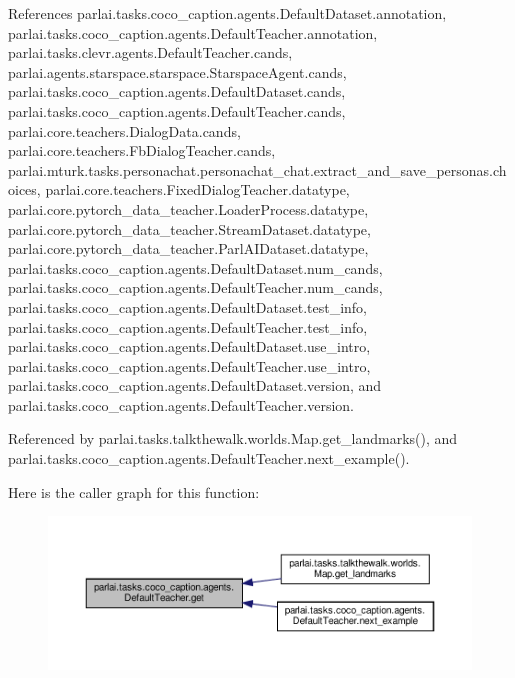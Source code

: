 References parlai.\+tasks.\+coco\+\_\+caption.\+agents.\+Default\+Dataset.\+annotation, parlai.\+tasks.\+coco\+\_\+caption.\+agents.\+Default\+Teacher.\+annotation, parlai.\+tasks.\+clevr.\+agents.\+Default\+Teacher.\+cands, parlai.\+agents.\+starspace.\+starspace.\+Starspace\+Agent.\+cands, parlai.\+tasks.\+coco\+\_\+caption.\+agents.\+Default\+Dataset.\+cands, parlai.\+tasks.\+coco\+\_\+caption.\+agents.\+Default\+Teacher.\+cands, parlai.\+core.\+teachers.\+Dialog\+Data.\+cands, parlai.\+core.\+teachers.\+Fb\+Dialog\+Teacher.\+cands, parlai.\+mturk.\+tasks.\+personachat.\+personachat\+\_\+chat.\+extract\+\_\+and\+\_\+save\+\_\+personas.\+choices, parlai.\+core.\+teachers.\+Fixed\+Dialog\+Teacher.\+datatype, parlai.\+core.\+pytorch\+\_\+data\+\_\+teacher.\+Loader\+Process.\+datatype, parlai.\+core.\+pytorch\+\_\+data\+\_\+teacher.\+Stream\+Dataset.\+datatype, parlai.\+core.\+pytorch\+\_\+data\+\_\+teacher.\+Parl\+A\+I\+Dataset.\+datatype, parlai.\+tasks.\+coco\+\_\+caption.\+agents.\+Default\+Dataset.\+num\+\_\+cands, parlai.\+tasks.\+coco\+\_\+caption.\+agents.\+Default\+Teacher.\+num\+\_\+cands, parlai.\+tasks.\+coco\+\_\+caption.\+agents.\+Default\+Dataset.\+test\+\_\+info, parlai.\+tasks.\+coco\+\_\+caption.\+agents.\+Default\+Teacher.\+test\+\_\+info, parlai.\+tasks.\+coco\+\_\+caption.\+agents.\+Default\+Dataset.\+use\+\_\+intro, parlai.\+tasks.\+coco\+\_\+caption.\+agents.\+Default\+Teacher.\+use\+\_\+intro, parlai.\+tasks.\+coco\+\_\+caption.\+agents.\+Default\+Dataset.\+version, and parlai.\+tasks.\+coco\+\_\+caption.\+agents.\+Default\+Teacher.\+version.



Referenced by parlai.\+tasks.\+talkthewalk.\+worlds.\+Map.\+get\+\_\+landmarks(), and parlai.\+tasks.\+coco\+\_\+caption.\+agents.\+Default\+Teacher.\+next\+\_\+example().

Here is the caller graph for this function\+:
\nopagebreak
\begin{figure}[H]
\begin{center}
\leavevmode
\includegraphics[width=350pt]{classparlai_1_1tasks_1_1coco__caption_1_1agents_1_1DefaultTeacher_ac50d86244a0030b91090d7c1ef4d7c72_icgraph}
\end{center}
\end{figure}
\mbox{\label{classparlai_1_1tasks_1_1coco__caption_1_1agents_1_1DefaultTeacher_a836bf6068d0155b03bcc796c77480f1f}} 
